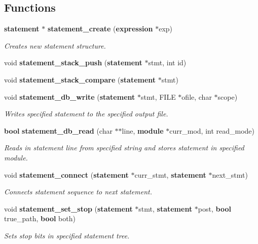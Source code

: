 \subsection*{Functions}
\begin{CompactItemize}
\item 
{\bf statement} $\ast$ {\bf statement\_\-create} ({\bf expression} $\ast$exp)
\begin{CompactList}\small\item\em Creates new statement structure.\item\end{CompactList}\item 
void {\bf statement\_\-stack\_\-push} ({\bf statement} $\ast$stmt, int id)
\item 
void {\bf statement\_\-stack\_\-compare} ({\bf statement} $\ast$stmt)
\item 
void {\bf statement\_\-db\_\-write} ({\bf statement} $\ast$stmt, FILE $\ast$ofile, char $\ast$scope)
\begin{CompactList}\small\item\em Writes specified statement to the specified output file.\item\end{CompactList}\item 
{\bf bool} {\bf statement\_\-db\_\-read} (char $\ast$$\ast$line, {\bf module} $\ast$curr\_\-mod, int read\_\-mode)
\begin{CompactList}\small\item\em Reads in statement line from specified string and stores statement in specified module.\item\end{CompactList}\item 
void {\bf statement\_\-connect} ({\bf statement} $\ast$curr\_\-stmt, {\bf statement} $\ast$next\_\-stmt)
\begin{CompactList}\small\item\em Connects statement sequence to next statement.\item\end{CompactList}\item 
void {\bf statement\_\-set\_\-stop} ({\bf statement} $\ast$stmt, {\bf statement} $\ast$post, {\bf bool} true\_\-path, {\bf bool} both)
\begin{CompactList}\small\item\em Sets stop bits in specified statement tree.\item\end{CompactList}\item 
$$
\end{CompactItemize}
